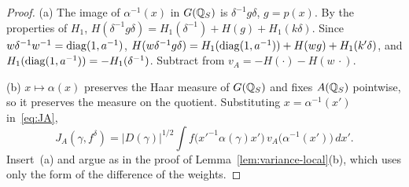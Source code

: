 \begin{proof}
(a) The image of $\alpha^{-1}(x)$ in $G(\mathbb{Q}_S)$ is $\delta^{-1}g\delta$,
$g=p(x)$. By the properties of $H_1$, $H(\delta^{-1}g\delta)=H_1(
\delta^{-1})+H(g)+H_1(k\delta)$. Since $w\delta^{-1}w^{-1}=\operatorname{diag}(1,a^{-1})$,
$H(w\delta^{-1}g\delta)=H_1(\operatorname{diag}(1,a^{-1}))+H(wg)+H_1(k'\delta)$, and
$H_1(\operatorname{diag}(1,a^{-1}))=-H_1(\delta^{-1})$. Subtract from
$v_A=-H(\cdot)-H(w\,\cdot)$.

(b) $x\mapsto\alpha(x)$ preserves the Haar measure of $G(\mathbb{Q}_S)$ and fixes
$A(\mathbb{Q}_S)$ pointwise, so it preserves the measure on the quotient.
Substituting $x=\alpha^{-1}(x')$ in~\eqref{eq:JA},
\[
J_A(\gamma,f^\delta)=|D(\gamma)|^{1/2}\int f\bigl(x'^{-1}\alpha(\gamma)x'
\bigr)\,v_A\bigl(\alpha^{-1}(x')\bigr)\,dx' .
\]
Insert~(a) and argue as in the proof of
Lemma~\ref{lem:variance-local}(b), which uses only the form of the
difference of the weights.


\end{proof}
